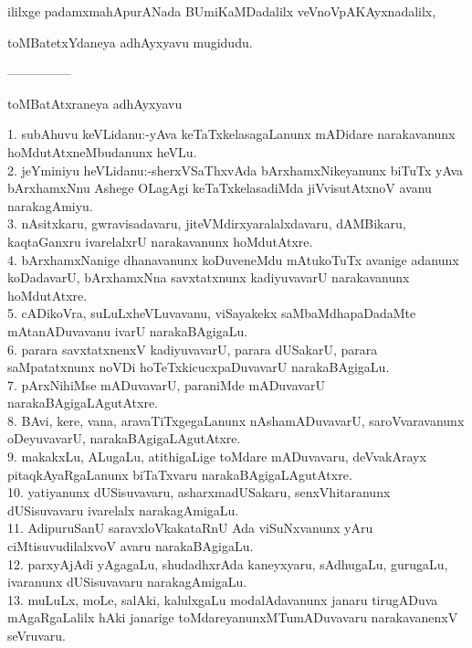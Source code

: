\documentclass{article}
\begin{document}
\begin{center}
ililxge padamxmahApurANada BUmiKaMDadalilx veVnoVpAKAyxnadalilx,
\end{center}

\begin{center}
toMBatetxYdaneya adhAyxyavu mugidudu.
\end{center}

\begin{center}
---------------
\end{center}

\begin{center}
toMBatAtxraneya adhAyxyavu
\end{center}

1. subAhuvu keVLidanu:-yAva keTaTxkelasagaLanunx mADidare narakavanunx hoMdutAtxneMbudanunx heVLu.\\
2. jeYminiyu heVLidanu:-sherxVSaThxvAda bArxhamxNikeyanunx biTuTx yAva bArxhamxNnu Ashege OLagAgi keTaTxkelasadiMda jiVvisutAtxnoV avanu narakagAmiyu.\\
3. nAsitxkaru, gwravisadavaru, jiteVMdirxyaralalxdavaru, dAMBikaru, kaqtaGanxru ivarelalxrU narakavanunx hoMdutAtxre.\\
4. bArxhamxNanige dhanavanunx koDuveneMdu mAtukoTuTx avanige adanunx koDadavarU, bArxhamxNna savxtatxnunx kadiyuvavarU narakavanunx hoMdutAtxre.\\
5. cADikoVra, suLuLxheVLuvavanu, viSayakekx saMbaMdhapaDadaMte mAtanADuvavanu ivarU narakaBAgigaLu.\\
6. parara savxtatxnenxV kadiyuvavarU, parara dUSakarU, parara saMpatatxnunx noVDi hoTeTxkicucxpaDuvavarU narakaBAgigaLu.\\
7. pArxNihiMse mADuvavarU, paraniMde mADuvavarU narakaBAgigaLAgutAtxre.\\
8. BAvi, kere, vana, aravaTiTxgegaLanunx nAshamADuvavarU, saroVvaravanunx oDeyuvavarU, narakaBAgigaLAgutAtxre.\\
9. makakxLu, ALugaLu, atithigaLige toMdare mADuvavaru, deVvakArayx pitaqkAyaRgaLanunx biTaTxvaru  narakaBAgigaLAgutAtxre.\\
10. yatiyanunx dUSisuvavaru, asharxmadUSakaru, senxVhitaranunx dUSisuvavaru ivarelalx narakagAmigaLu.\\
11. AdipuruSanU saravxloVkakataRnU Ada viSuNxvanunx yAru ciMtisuvudilalxvoV avaru narakaBAgigaLu.\\
12. parxyAjAdi yAgagaLu, shudadhxrAda kaneyxyaru, sAdhugaLu, gurugaLu, ivaranunx dUSisuvavaru narakagAmigaLu.\\
13. muLuLx, moLe, salAki, kalulxgaLu modalAdavanunx janaru tirugADuva mAgaRgaLalilx hAki janarige toMdareyanunxMTumADuvavaru narakavanenxV seVruvaru.\\
\end{document}

